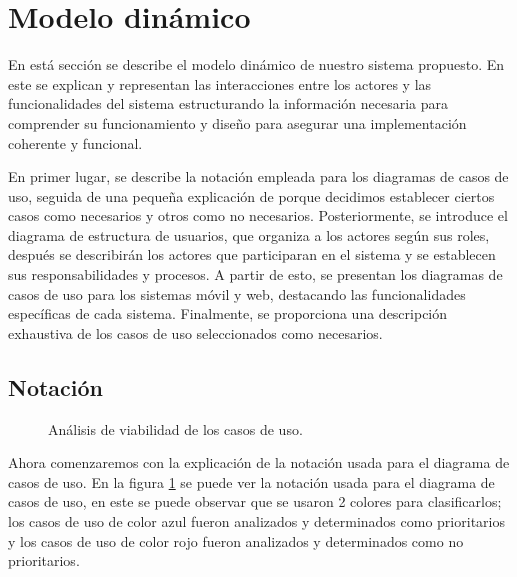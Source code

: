\section{Modelo dinámico}	
\label{cap:modDinamico}

En está sección se describe el modelo dinámico de nuestro sistema propuesto. En este se explican y representan las interacciones entre los actores y las funcionalidades del sistema estructurando la información necesaria para comprender su funcionamiento y diseño para asegurar una implementación coherente y funcional.

En primer lugar, se describe la notación empleada para los diagramas de casos de uso, seguida de una pequeña explicación de porque decidimos establecer ciertos casos como necesarios y otros como no necesarios. Posteriormente, se introduce el diagrama de estructura de usuarios, que organiza a los actores según sus roles, después se describirán los actores que participaran en el sistema y se establecen sus responsabilidades y procesos. A partir de esto, se presentan los diagramas de casos de uso para los sistemas móvil y web, destacando las funcionalidades específicas de cada sistema. Finalmente, se proporciona una descripción exhaustiva de los casos de uso seleccionados como necesarios.

\subsection{Notación}


\begin{figure}[htbp!]
	\begin{center}
		\caption{Análisis de viabilidad de los casos de uso.}
		\label{fig:Notacion}
	\end{center}
\end{figure}

Ahora comenzaremos con la explicación de la notación usada para el diagrama de casos de uso. En la figura \ref{fig:Notacion} se puede ver la notación usada para el diagrama de casos de uso, en este se puede observar que se usaron 2 colores para clasificarlos; los casos de uso de color azul fueron analizados y determinados como prioritarios y los casos de uso de color rojo fueron analizados y determinados como no prioritarios.

